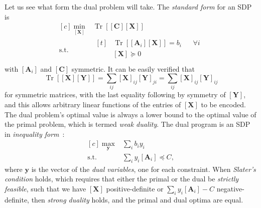 \documentclass[10pt, a4paper]{article}
\numberwithin{equation}{section} %
\theoremstyle{definition}
\theoremstyle{plain}
\newcommand{\?}{\mathrel{?}} %
\newcommand{\cvec}[1]{\boldsymbol{\mathbf{#1}}}    %
\newcommand{\matr}[2][]{\left[\mathbf{#2}#1\right]} %
\newcommand{\Tr}[2][]{\mathop{\mathrm{Tr}#1}\left[ #2 \right]} %
\begin{document}
                  Let us see what form the dual problem will take. The \emph{standard form} for an SDP is~\cite[Ch. 4.6.2]{BoydVand}
                  \begin{equation}
                    \begin{aligned}[c]
                      \min_{\matr{X}} & \Tr{ \matr{C}\matr{X} } \\
                      \text{s.t.} & \begin{aligned}[t]
                                  & \Tr{ \matr[_i]{A} \matr{X} } = b_i & & \forall i \\
                                  & \matr{X} \succeq 0 & & \\
                      \end{aligned}
                      \end{aligned}
                    \end{equation}
                    with \(\matr[_i]{A}\) and \(\matr{C}\) symmetric. It can be easily verified that
                    \begin{equation}
                      \Tr{\matr{X}\matr{Y}} = \sum_{ij} \matr{X}_{ij} \matr{Y}_{ji} = \sum_{ij} \matr{X}_{ij} \matr{Y}_{ij}
                    \end{equation}
                    for symmetric matrices, with the last equality following by symmetry of \(\matr{Y}\), and this allows arbitrary linear functions of the entries of \(\matr{X}\) to be encoded. The dual problem's optimal value is always a lower bound to the optimal value of the primal problem, which is termed \emph{weak duality}. The dual program is an SDP in \emph{inequality form}~\cite[Ch. 5.9]{BoydVand}:
                    \begin{equation}
                      \begin{aligned}[c]
                        \max_{\cvec{y}} & \sum_{i} b_i y_i \\
                        \text{s.t.} & \sum_{i} y_i \matr[_i]{A} \preceq C,
                      \end{aligned}
                    \end{equation}
                    where \(\cvec{y}\) is the vector of the \emph{dual variables}, one for each constraint. When \emph{Slater's condition} holds, which requires that either the primal or the dual be \emph{strictly feasible}, such that we have \(\matr{X}\) positive-definite or \(\sum_{i} y_i \matr[_i]{A} - C\) negative-definite, then \emph{strong duality} holds, and the primal and dual optima are equal.
\end{document}
